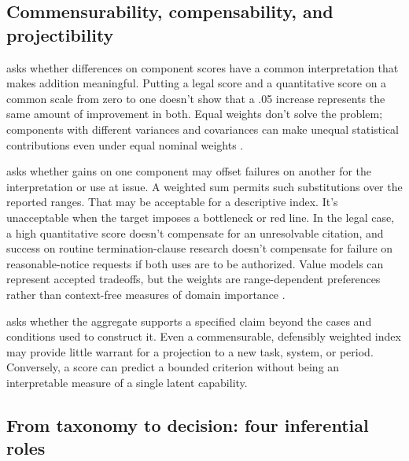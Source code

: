 \documentclass[12pt]{article}
\begin{document}
\subsection{Commensurability, compensability, and projectibility}\label{ssec:three_questions}

 asks whether differences on component scores have a common interpretation that makes addition meaningful. Putting a legal score and a quantitative score on a common scale from zero to one doesn't show that a .05 increase represents the same amount of improvement in both. Equal weights don't solve the problem; components with different variances and covariances can make unequal statistical contributions even under equal nominal weights \citep[305--308]{brennan2001generalizability}.

 asks whether gains on one component may offset failures on another for the interpretation or use at issue. A weighted sum permits such substitutions over the reported ranges. That may be acceptable for a descriptive index. It's unacceptable when the target imposes a bottleneck or red line. In the legal case, a high quantitative score doesn't compensate for an unresolvable citation, and success on routine termination-clause research doesn't compensate for failure on reasonable-notice requests if both uses are to be authorized. Value models can represent accepted tradeoffs, but the weights are range-dependent preferences rather than context-free measures of domain importance \citep{KeeneyRaiffa1993}.

 asks whether the aggregate supports a specified claim beyond the cases and conditions used to construct it. Even a commensurable, defensibly weighted index may provide little warrant for a projection to a new task, system, or period. Conversely, a score can predict a bounded criterion without being an interpretable measure of a single latent capability.

\subsection{From taxonomy to decision: four inferential roles}\label{ssec:chc_roles}
\end{document}
